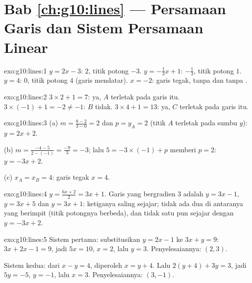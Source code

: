 \section*{Bab \ref{ch:g10:lines} --- Persamaan Garis dan Sistem Persamaan Linear}

\begin{solution}{exo:g10:lines:1}
$y = 2x - 3$:  $2$, titik potong $-3$.
$y = -\frac13 x + 1$:  $-\frac13$, titik potong $1$.
$y = 4$:  $0$, titik potong $4$ (garis mendatar).
$x = -2$: garis tegak, tanpa  dan tanpa .
\end{solution}

\begin{solution}{exo:g10:lines:2}
$3 \times 2 + 1 = 7$: ya, $A$ terletak pada garis itu.
$3 \times (-1) + 1 = -2 \neq -1$: $B$ tidak.
$3 \times 4 + 1 = 13$: ya, $C$ terletak pada garis itu.
\end{solution}

\begin{solution}{exo:g10:lines:3}
(a) $m = \frac{8 - 2}{3 - 0} = 2$ dan $p = y_A = 2$ (titik $A$ terletak pada
sumbu $y$): $y = 2x + 2$.

(b) $m = \frac{-4 - 5}{2 - (-1)} = \frac{-9}{3} = -3$; lalu
$5 = -3 \times (-1) + p$ memberi $p = 2$: $y = -3x + 2$.

(c) $x_A = x_B = 4$: garis tegak $x = 4$.
\end{solution}

\begin{solution}{exo:g10:lines:4}
$y = \frac{6x+2}{2} = 3x + 1$. Garis yang bergradien $3$ adalah $y = 3x - 1$,
$y = 3x + 5$ dan $y = 3x + 1$: ketiganya saling sejajar;
tidak ada dua di antaranya yang berimpit (titik potongnya berbeda), dan tidak
satu pun sejajar dengan $y = -3x + 2$.
\end{solution}

\begin{solution}{exo:g10:lines:5}
Sistem pertama: substitusikan $y = 2x - 1$ ke $3x + y = 9$:
$3x + 2x - 1 = 9$, jadi $5x = 10$, $x = 2$, lalu $y = 3$. Penyelesaiannya:
$(2, 3)$.

Sistem kedua: dari $x - y = 4$, diperoleh $x = y + 4$. Lalu
$2(y + 4) + 3y = 3$, jadi $5y = -5$, $y = -1$, lalu $x = 3$. Penyelesaiannya:
$(3, -1)$.
\end{solution}

